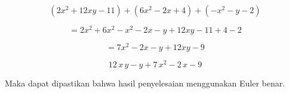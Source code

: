 \documentclass[a4paper,10pt]{article}
\begin{document}
\begin{eulernotebook}
\begin{eulercomment}
\begin{eulercomment}
\begin{eulercomment}
\begin{eulercomment}
\begin{eulercomment}
\begin{eulercomment}
\begin{eulercomment}
\begin{eulercomment}
\begin{eulercomment}
\begin{eulercomment}
\begin{eulercomment}
\begin{eulercomment}
\begin{eulercomment}
\end{eulercomment}
\begin{eulercomment}
\end{eulercomment}
\begin{eulerformula}
\[
(2x^2 + 12xy - 11) + (6x^2 - 2x + 4) + (-x^2 - y - 2)
\]
\end{eulerformula}
\begin{eulercomment}
\end{eulercomment}
\begin{eulerformula}
\[
= 2x^2 + 6x^2 - x^2 - 2x - y + 12xy - 11 + 4 - 2
\]
\end{eulerformula}
\begin{eulercomment}
\end{eulercomment}
\begin{eulerformula}
\[
= 7x^2 - 2x - y + 12xy - 9
\]
\end{eulerformula}
\begin{eulerformula}
\[
12\,x\,y-y+7\,x^2-2\,x-9
\]
\end{eulerformula}
\begin{eulercomment}
Maka dapat dipastikan bahwa hasil penyelesaian menggunakan Euler
benar.
\end{eulercomment}
\begin{eulercomment}



\end{eulercomment}
\end{eulercomment}
\end{eulercomment}
\end{eulercomment}
\end{eulercomment}
\end{eulercomment}
\end{eulercomment}
\end{eulercomment}
\end{eulercomment}
\end{eulercomment}
\end{eulercomment}
\end{eulercomment}
\end{eulercomment}
\end{eulernotebook}
\end{document}
